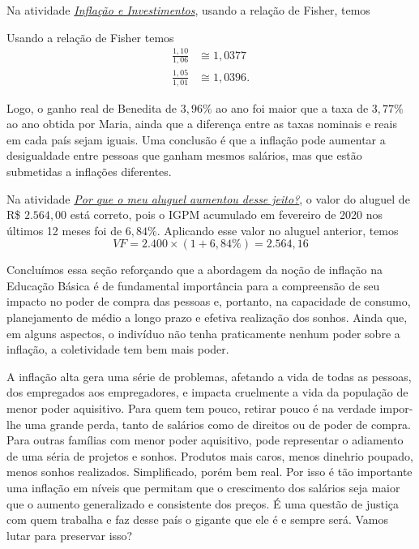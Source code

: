 Na atividade \hyperref[fin-ativ-31]{\textit{Inflação e Investimentos}}, usando a relação de Fisher, temos

Usando a relação de Fisher temos
\begin{align*}
\frac{1{,}10}{1{,}06}&\cong1{,}0377\\
\frac{1{,}05}{1{,}01}&\cong1{,}0396.
\end{align*}

Logo, o ganho real de Benedita de $3{,}96\%$ ao ano foi maior que a taxa de $3{,}77\%$ ao ano obtida por Maria, ainda que a diferença entre as taxas nominais e reais em cada país sejam iguais. Uma conclusão é que a inflação pode aumentar a desigualdade entre pessoas que ganham mesmos salários, mas que estão submetidas a inflações diferentes.

Na atividade \hyperref[fin-ativ-32]{\textit{Por que o meu aluguel aumentou desse jeito?}}, o valor do aluguel de R\$ $2.564{,}00$ está correto, pois o IGPM acumulado em fevereiro de 2020 nos últimos 12 meses foi de $6{,}84$\%. Aplicando esse valor no aluguel anterior, temos
\begin{equation*}
\mathit{VF}=2.400\times(1+6{,}84\%)=2.564{,}16
\end{equation*}

Concluímos essa seção reforçando que a abordagem da noção de inflação na Educação Básica é de fundamental importância para a compreensão de seu impacto no poder de compra das pessoas e, portanto, na capacidade de consumo, planejamento de médio a longo prazo e efetiva realização dos sonhos. Ainda que, em alguns aspectos, o indivíduo não tenha praticamente nenhum poder sobre a inflação, a coletividade tem bem mais poder.

A inflação alta gera uma série de problemas, afetando a vida de todas as pessoas, dos empregados aos empregadores, e impacta cruelmente a vida da população de menor poder aquisitivo. Para quem tem pouco, retirar pouco é na verdade impor-lhe uma grande perda, tanto de salários como de direitos ou de poder de compra. Para outras famílias com menor poder aquisitivo, pode representar o adiamento de uma séria de projetos e sonhos. Produtos mais caros, menos dinehrio poupado, menos sonhos realizados. Simplificado, porém bem real. Por isso é tão importante uma inflação em níveis que permitam que o crescimento dos salários seja maior que o aumento generalizado e consistente dos preços. É uma questão de justiça com quem trabalha e faz desse país o gigante que ele é e sempre será. Vamos lutar para preservar isso?

